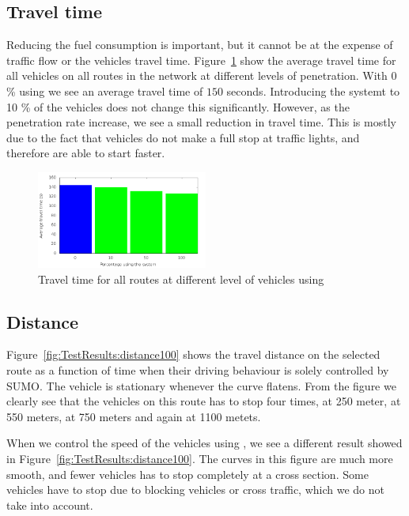 \subsection{Travel time}
Reducing the fuel consumption is important, but it cannot be at the expense of traffic flow or the vehicles travel time.
Figure~\ref{fig:TestResults:combinedTime} show the average travel time for all vehicles on all routes in the network at different levels of penetration.
With 0 \% using \tech we see an average travel time of $150$ seconds. 
Introducing the systemt to 10 \% of the vehicles does not change this significantly. 
However, as the penetration rate increase, we see a small reduction in travel time. 
This is mostly due to the fact that vehicles do not make a full stop at traffic lights, and therefore are able to start faster.

\begin{figure}[h]
\includegraphics[width=0.5\textwidth]{../images/tp0/combinedTime.png}
\caption{Travel time for all routes at different level of vehicles using \tech}
\label{fig:TestResults:combinedTime}
\end{figure}

\subsection{Distance}
Figure~\ref{fig:TestResults:distance100} shows the travel distance on the selected route as a function of time when their driving behaviour is solely controlled by SUMO. 
The vehicle is stationary whenever the curve flatens.
From the figure we clearly see that the vehicles on this route has to stop four times, at 250 meter, at 550 meters, at 750 meters and again at 1100 metets.

When we control the speed of the vehicles using \tech, we see a different result showed in Figure~\ref{fig:TestResults:distance100}.
The curves in this figure are much more smooth, and fewer vehicles has to stop completely at a cross section.
Some vehicles have to stop due to blocking vehicles or cross traffic, which we do not take into account.

